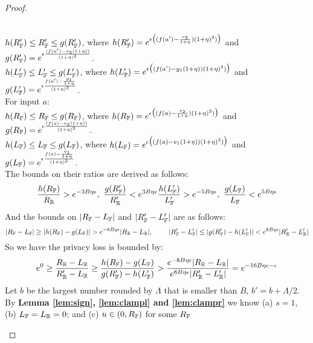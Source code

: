 \documentclass[a4paper,11pt]{article}
\begin{document}
\begin{proof}
\begin{itemize}
		\\
		$h(R_{\mathbb{F}}') \leq R_{\mathbb{F}}' \leq g(R_{\mathbb{F}}')$, 
		where
		$h(R_{\mathbb{F}}') = e^{\epsilon 
		\big( (f(a') - \frac{v_2}{1 + \eta}) (1 + \eta)^2) \big)}$
		and 
		$g(R_{\mathbb{F}}') = e^{\epsilon 
		\frac{(f(a') - v_2(1 + \eta))}{(1 + \eta)^2}}$.
		\\
		$h(L_{\mathbb{F}}') \leq L_{\mathbb{F}}' \leq g(L_{\mathbb{F}}')$, 
		where
		$h(L_{\mathbb{F}}') = e^{\epsilon 
		\big( (f(a') - y_1(1 + \eta)) (1 + \eta)^2) \big)}$
		and 
		$g(L_{\mathbb{F}}') = e^{\epsilon 
				\frac{f(a') - \frac{y_1}{1 + \eta}}{(1 + \eta)^2}}$.
		\\
		For input $a$:
		\\
		$h(R_{\mathbb{F}}) \leq R_{\mathbb{F}} \leq g(R_{\mathbb{F}})$, 
		where
		$h(R_{\mathbb{F}}) = e^{\epsilon 
				\big( (f(a) - \frac{v_2}{1 + \eta}) (1 + \eta)^2) \big)}$
		and 
		$g(R_{\mathbb{F}}) = e^{\epsilon 
				\frac{(f(a) - v_2(1 + \eta))}{(1 + \eta)^2}}$.
		\\
		$h(L_{\mathbb{F}}) \leq L_{\mathbb{F}} \leq g(L_{\mathbb{F}})$, 
		where
		$h(L_{\mathbb{F}}) = e^{\epsilon 
				\big( (f(a) - v_1(1 + \eta)) (1 + \eta)^2) \big)}$
		and 
		$g(L_{\mathbb{F}}) = e^{\epsilon 
				\frac{f(a) - \frac{v_1}{1 + \eta}}{(1 + \eta)^2}}$.
		\\
		The bounds on their ratios are derived as follows:
		\[
		\frac{h(R_{\mathbb{F}})}{R_{\mathbb{R}}} > e^{-3B\eta \epsilon}, 
		~ 
		\frac{g(R_{\mathbb{F}}')}{R_{\mathbb{R}}'} < e^{3B\eta \epsilon}
		\frac{h(L_{\mathbb{F}}')}{L_{\mathbb{F}}'} > e^{-5B\eta \epsilon}, 
		~ 
		\frac{g(L_{\mathbb{F}})}{L_{\mathbb{F}}} < e^{5B\eta \epsilon}
		\]
		And the bounds on $|R_{\mathbb{F}} - L_{\mathbb{F}}|$ and $|R_{\mathbb{F}}' - L_{\mathbb{F}}'|$ are as follows:
		\[
		|R_{\mathbb{F}} - L_{\mathbb{F}}|
		\geq
		|h(R_{\mathbb{F}}) - g(L_{\mathbb{F}})| > e^{-8 B\eta \epsilon}
		|R_{\mathbb{R}} - L_{\mathbb{R}}|, 
		~~~~~~~
		|R_{\mathbb{F}}' - L_{\mathbb{F}}'|
		\leq
		|g(R_{\mathbb{F}}') - h(L_{\mathbb{F}}')| < e^{8 B\eta \epsilon}
		|R_{\mathbb{R}}' - L_{\mathbb{R}}'|
		\]
		So we have the privacy loss is bounded by:
		\[
		e^0 
		\geq 
		\frac{R_{\mathbb{R}} - L_{\mathbb{R}}}{R_{\mathbb{R}}' - L_{\mathbb{R}}}
		\geq
		\frac{h(R_{\mathbb{F}}) - g(L_{\mathbb{F}})}
		{g(R_{\mathbb{F}}') - h(L_{\mathbb{F}}')}
		> \frac{e^{-8 B\eta \epsilon}|R_{\mathbb{R}} - L_{\mathbb{R}}|}
		{e^{8 B\eta \epsilon}|R_{\mathbb{R}}' - L_{\mathbb{R}}'|}
		= e^{-16B \eta \epsilon - \epsilon}
		\]
		Let $b$ be the largest number rounded by $\Lambda$ that is smaller than $B$, $b' = b + \Lambda / 2$.
		\\
		By \textbf{Lemma \ref{lem:sign}, \ref{lem:clampl} and \ref{lem:clampr}} we know 
		(a) $s = 1$, 
		(b) $L_{\mathbb{F}} = L_{\mathbb{R}} = 0$;
		and (c) $u \in (0, R_{\mathbb{F}})$ for some $R_{\mathbb{F}}$

\end{itemize}
\end{proof}
\end{document}
